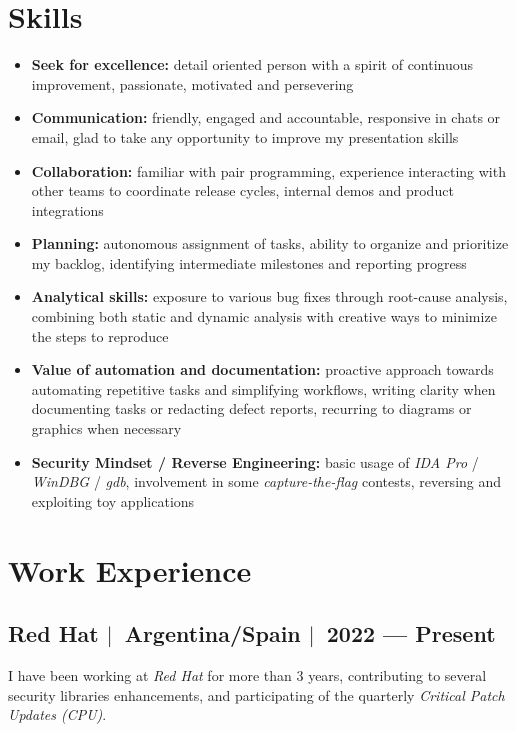 \documentclass[12pt, a4paper]{article}
\newcommand{\mysep}{{\Large $\mid$}\ }
\newcommand{\titledItem}[2]{\item \textbf{#1:} #2}
\begin{document}
    \section*{Skills} \label{sec:skills}
    \begin{itemize}
        \titledItem{Seek for excellence}{%
            detail oriented person with a spirit of continuous improvement,
            passionate, motivated and persevering
        }
        \titledItem{Communication}{%
            friendly, engaged and accountable,
            responsive in chats or email,
            glad to take any opportunity to improve my presentation skills
        }
        \titledItem{Collaboration}{%
            familiar with pair programming,
            experience interacting with other teams to coordinate release cycles,
            internal demos and product integrations
        }
        \titledItem{Planning}{%
            autonomous assignment of tasks,
            ability to organize and prioritize my backlog,
            identifying intermediate milestones and reporting progress
        }
        \titledItem{Analytical skills}{%
            exposure to various bug fixes through root-cause analysis,
            combining both static and dynamic analysis with
            creative ways to minimize the steps to reproduce
        }
        \titledItem{Value of automation and documentation}{%
            proactive approach towards automating repetitive tasks and simplifying workflows,
            writing clarity when documenting tasks or redacting defect reports,
            recurring to diagrams or graphics when necessary
        }
        \titledItem{Security Mindset / Reverse Engineering}{%
            basic usage of \emph{IDA Pro} / \emph{WinDBG} / \emph{gdb},
            involvement in some \emph{capture-the-flag} contests,
            reversing and exploiting toy applications
        }
    \end{itemize}

    \section*{Work Experience} \label{sec:experience}

    \subsection*{Red Hat \mysep Argentina/Spain \mysep 2022 --- Present} \label{subsec:job1}
    I have been working at \emph{Red Hat} for more than 3 years,
    contributing to several security libraries enhancements,
    and participating of the quarterly \emph{Critical Patch Updates (CPU)}.
\end{document}
